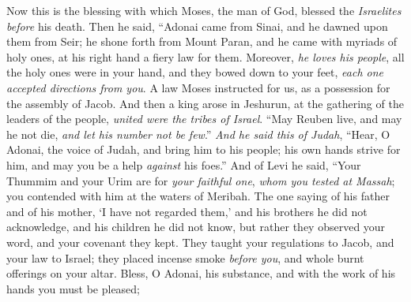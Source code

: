 \begin{biblechapter} %
 Now this is the blessing with which Moses, the man of God, blessed the \textit{Israelites} \textit{before} his death.
\verse Then he said,
\verse “Adonai came from Sinai, 
and he dawned upon them from Seir; 
he shone forth from Mount Paran, 
and he came with myriads of holy ones, 
at his right hand a fiery law for them.
\verse Moreover, \textit{he loves his people}, 
all the holy ones were in your hand, 
and they bowed down to your feet, 
\textit{each one accepted directions from you}.
\verse A law Moses instructed for us, 
as a possession for the assembly of Jacob.
\verse And then a king arose in Jeshurun, 
at the gathering of the leaders of the people, 
\textit{united were the tribes of Israel}.
\verse “May Reuben live, and may he not die, 
\textit{and let his number not be few}.”
\verse \textit{And he said this of Judah}, 
“Hear, O Adonai, the voice of Judah, 
and bring him to his people; 
his own hands strive for him, 
and may you be a help \textit{against} his foes.”
\verse And of Levi he said, 
“Your Thummim and your Urim 
are for \textit{your faithful one}, 
\textit{whom you tested at Massah}; 
you contended with him 
at the waters of Meribah.
\verse The one saying of his father and of his mother, 
‘I have not regarded them,’ 
and his brothers he did not acknowledge, 
and his children he did not know, 
but rather they observed your word, 
and your covenant they kept.
\verse They taught your regulations to Jacob, 
and your law to Israel; 
they placed incense smoke \textit{before you}, 
and whole burnt offerings on your altar.
\verse Bless, O Adonai, his substance, 
and with the work of his hands you must be pleased; 

\end{biblechapter}
